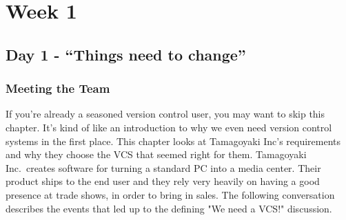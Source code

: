 \chapter{Week 1}
\section{Day 1 - ``Things need to change''}
\subsection{Meeting the Team}

If you're already a seasoned version control user, you may want to skip this chapter.
It's kind of like an introduction to why we even need version control systems in the first place.
This chapter looks at Tamagoyaki Inc's requirements and why they choose the VCS that seemed right for them.
Tamagoyaki Inc.\ creates software for turning a standard PC into a media center.
Their product ships to the end user and they rely very heavily on having a good presence at trade shows, in order to bring in sales.
The following conversation describes the events that led up to the defining "We need a VCS!" discussion.

